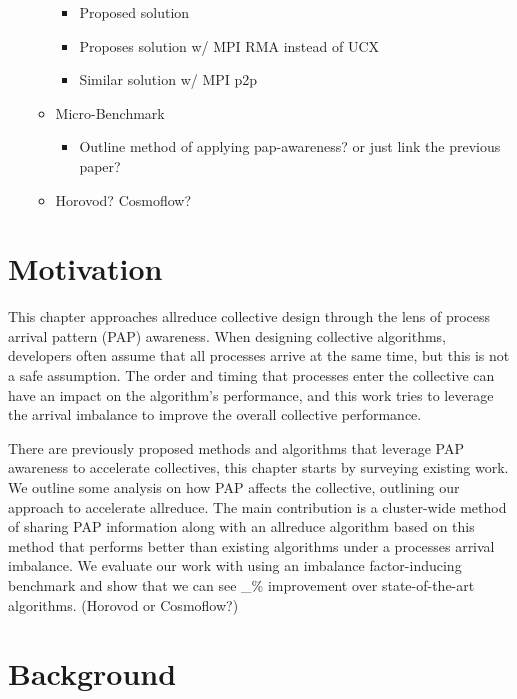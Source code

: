 \begin{itemize}
\begin{itemize}
        \begin{itemize}
            \item Proposed solution
            \item Proposes solution w/ MPI RMA instead of UCX
            \item Similar solution w/ MPI p2p \cite{Parsons2015ExpProcImbMPICollHierarcialSys, Patarasuk2008EffBcastDifProcArr}
        \end{itemize}
        \item Micro-Benchmark
            \begin{itemize}
                \item Outline method of applying pap-awareness? or just link the previous paper?
            \end{itemize}
        \item Horovod? Cosmoflow?
    \end{itemize}
\end{itemize}

\section{Motivation}

This chapter approaches allreduce collective design through the lens of process arrival pattern (PAP) awareness. 
When designing collective algorithms, developers often assume that all processes arrive at the same time, but this is not a safe assumption.
The order and timing that processes enter the collective can have an impact on the algorithm's performance, and this work tries to leverage the arrival imbalance to improve the overall collective performance.

There are previously proposed methods and algorithms that leverage PAP awareness to accelerate collectives, this chapter starts by surveying existing work.
We outline some analysis on how PAP affects the collective, outlining our approach to accelerate allreduce.
The main contribution is a cluster-wide method of sharing PAP information along with an allreduce algorithm based on this method that performs better than existing algorithms under a processes arrival imbalance.
We evaluate our work with using an imbalance factor-inducing benchmark and show that we can see \_\% improvement over state-of-the-art algorithms.  
(Horovod or Cosmoflow?)

\section{Background}


